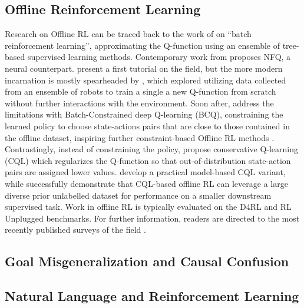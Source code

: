 \documentclass[../thesis-proposal/main.tex]{subfiles}
\begin{document}
\subsection{Offline Reinforcement Learning}

Research on Offline RL can be traced back to the work of \citet{ernst_tree-based_2005} on ``batch
reinforcement learning'', approximating the Q-function using an ensemble of tree-based supervised
learning methods. Contemporary work from \citet{riedmiller_neural_2005} proposes NFQ, a neural
counterpart.  present a first tutorial on the field, but the more modern
incarnation is mostly spearheaded by \citet{kalashnikov_scalable_2018}, which explored utilizing
data collected from an ensemble of robots to train a single a new Q-function from scratch without
further interactions with the environment. Soon after, \citet{fujimoto_off-policy_2019} address the
limitations with Batch-Constrained deep Q-learning (BCQ), constraining the learned policy to choose
state-actions pairs that are close to those contained in the offline dataset, inspiring further
constraint-based Offline RL methods \citep{kumar_stabilizing_2019, xu_offline_2021}. Contrastingly,
instead of constraining the policy, \citet{kumar_conservative_2020} propose conservative Q-learning
(CQL) which regularizes the Q-function so that out-of-distribution state-action pairs are assigned
lower values.  develop a practical model-based CQL variant, while
\citet{singh_cog_2020} successfully demonstrate that CQL-based offline RL can leverage a large
diverse prior unlabelled dataset for performance on a smaller downstream supervised task. Work in
offline RL is typically evaluated on the D4RL \citep{fu_d4rl_2021} and RL Unplugged
\citep{gulcehre_rl_2020} benchmarks. For further information, readers are directed to the most
recently published surveys of the field \citep{levine_offline_2020, prudencio_survey_2022}.

\subsection{Goal Misgeneralization and Causal Confusion} 

\subsection{Natural Language and Reinforcement Learning} 

\ifSubfilesClassLoaded{%
  
}{}
\end{document}
